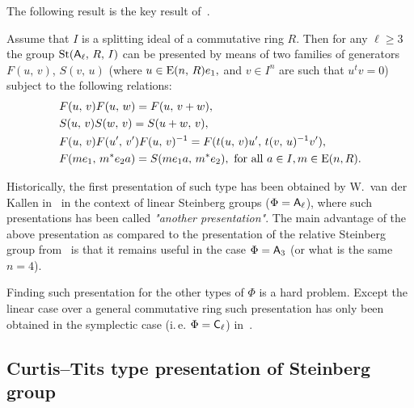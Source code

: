 The following result is the key result of~\cite{LS17}.
\begin{prop}
    \label{prop:rel-presentation}
    Assume that $I$ is a splitting ideal of a commutative ring $R$.
    Then for any $\ell\geq 3$ the group $\operatorname{St}(\mathsf{A}_\ell,\,R,\,I)$ can be presented by means of two families of generators $F(u,\,v)$, $S(v,\,u)$
    (where $u\in \operatorname{E}(n,\,R)e_1,$ and $v\in I^n$ are such that $u^{t}v=0$) subject to the following relations:
    \begin{align}
        &F(u,\,v)F(u,\,w)=F(u,\,v+w), \label{add4}\\
        &S(u,\,v)S(w,\,v)=S(u+w,\,v), \label{add5}\\
        &F(u,\,v)F(u',\,v')F(u,\,v)^{-1}=F(t(u,\,v)u',\,t(v,\,u)^{-1} v'), \label{conj3} \\
        &F(me_1,\,m^{*}e_{2}a)=S(me_{1}a,\,m^{*}e_{2}),\ \text{for all $a\in I$,}\, m \in \operatorname{E}(n, R). \label{coef-move}
    \end{align}
\end{prop}
Historically, the first presentation of such type has been obtained by W.~van der Kallen in~\cite{Ka77} in the context of linear Steinberg groups ($\Phi = \mathsf{A}_\ell$),
 where such presentations has been called \textit{"another presentation"}.
The main advantage of the above presentation as compared to the presentation of the relative Steinberg group from~\cite{Tu83} is that it remains useful
 in the case $\Phi = \mathsf{A}_3$ (or what is the same $n = 4$).

Finding such presentation for the other types of $\Phi$ is a hard problem.
Except the linear case over a general commutative ring such presentation has only been obtained in the symplectic case (i.\,e. $\Phi = \mathsf{C}_\ell$) in~\cite{La15}.

\subsection{Curtis--Tits type presentation of Steinberg group} \label{subsec:curtis-tits}